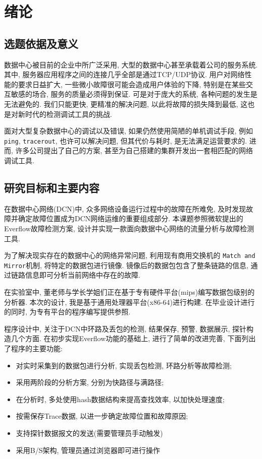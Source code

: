 ﻿%

\chapter{绪论}
\section{选题依据及意义}

数据中心被目前的企业中所广泛采用,
大型的数据中心甚至承载着公司的服务系统. 其中,
服务器应用程序之间的连接几乎全部是通过TCP/UDP协议.
用户对网络性能的要求日益扩大, 一些微小故障很可能会造成用户体验的下降,
特别是在某些交互敏感的场合, 服务的质量必须得到保证. 可是对于庞大的系统,
各种问题的发生是无法避免的. 我们只能更快, 更精准的解决问题,
以此将故障的损失降到最低, 这也是对新时代的检测调试工具的挑战.

面对大型复杂数据中心的调试以及错误, 如果仍然使用简陋的单机调试手段,
例如\texttt{ping}, \texttt{tracerout}, 也许可以解决问题, 但其代价与耗时,
是无法满足运营要求的. 进而, 许多公司提出了自己的方案,
甚至为自己搭建的集群开发出一套相匹配的网络调试工具.


\section{研究目标和主要内容}

在数据中心网络(DCN)中, 众多网络设备运行过程中的故障在所难免,
及时发现故障并确定故障位置成为DCN网络运维的重要组成部分.
本课题参照微软提出的Everflow故障检测方案,
设计并实现一款面向数据中心网络的流量分析与故障检测工具.

为了解决现实存在的数据中心的网络异常问题, 利用现有商用交换机的
\texttt{Match and Mirror}机制, 将特定的数据包进行镜像.
镜像后的数据包包含了整条链路的信息,
通过链路信息即可分析当前网络中存在的故障.


  在实验室中, 董老师与学长学姐们正在基于专有硬件平台(mips)编写数据包级别的分析器.
本次的设计, 我是基于通用处理器平台(x86-64)进行构建. 在毕业设计进行的同时,
为专有平台的程序编写提供参照.

  程序设计中, 关注于DCN中环路及丢包的检测,
结果保存, 预警, 数据展示, 探针构造几个方面. 在初步实现Everflow功能的基础上,
进行了简单的改进完善, 下面列出了程序的主要功能:

\begin{itemize}
\item
  对实时采集到的数据包进行分析, 实现丢包检测, 环路分析等故障检测;
\item
  采用两阶段的分析方案, 分别为快路径与满路径;
\item
  在分析时, 多处使用hash数据结构来提高查找效率, 以加快处理速度;
\item
  按需保存Trace数据, 以进一步确定故障位置和故障原因;
\item
  支持探针数据报文的发送(需要管理员手动触发)
\item
  采用B/S架构, 管理员通过浏览器即可进行操作
\end{itemize}

